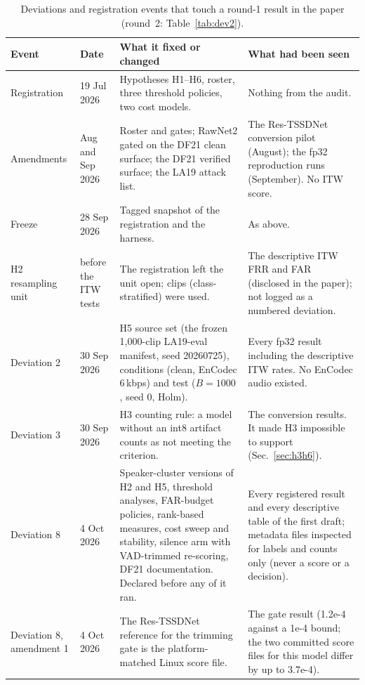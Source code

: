 \documentclass[10pt]{article}
\begin{document}
\begin{table}[!ht]
\caption{Deviations and registration events that touch a round-1 result in the paper (round~2: Table~\ref{tab:dev2}).}
\label{tab:dev}
\centering
\footnotesize
\setlength{\tabcolsep}{3pt}
\begin{tabular}{@{}p{}p{}p{}p{}@{}}
\toprule
Event & Date & What it fixed or changed & What had been seen \\
\midrule
Registration & 19 Jul 2026 & Hypotheses H1--H6, roster, three threshold policies, two cost models. & Nothing from the audit. \\
Amendments & Aug and Sep 2026 & Roster and gates; RawNet2 gated on the DF21 clean surface; the DF21 verified surface; the LA19 attack list. &
The Res-TSSDNet conversion pilot (August); the fp32 reproduction runs (September). No ITW score. \\
Freeze & 28 Sep 2026 & Tagged snapshot of the registration and the harness. & As above. \\
H2 resampling unit & before the ITW tests & The registration left the unit open; clips (class-stratified) were used. & The descriptive ITW FRR and FAR (disclosed in the
paper); not logged as a numbered deviation. \\
Deviation 2 & 30 Sep 2026 & H5 source set (the frozen 1,000-clip LA19-eval manifest, seed 20260725), conditions (clean, EnCodec 6\,kbps) and test
(\(B=1000\), seed 0, Holm). & Every fp32 result including the descriptive ITW rates. No EnCodec audio existed. \\
Deviation 3 & 30 Sep 2026 & H3 counting rule: a model without an int8 artifact counts as not meeting the criterion. & The conversion results. It
made H3 impossible to support (Sec.~\ref{sec:h3h6}). \\
Deviation 8 & 4 Oct 2026 & Speaker-cluster versions of H2 and H5, threshold analyses, FAR-budget policies, rank-based measures, cost sweep and
stability, silence arm with VAD-trimmed re-scoring, DF21 documentation. Declared before any of it ran. & Every registered result and every descriptive
table of the first draft; metadata files inspected for labels and counts only (never a score or a decision). \\
Deviation 8, amendment 1 & 4 Oct 2026 & The Res-TSSDNet reference for the trimming gate is the platform-matched Linux score file. & The gate
result (1.2e-4 against a 1e-4 bound; the two committed score files for this model differ by up to 3.7e-4). \\

\end{tabular}
\end{table}
\end{document}
